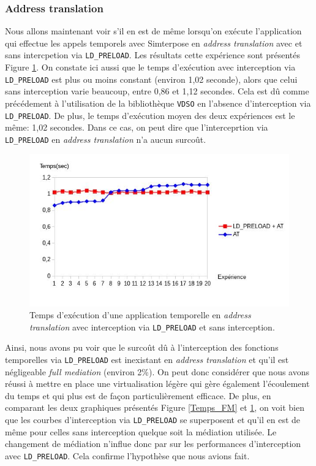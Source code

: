 \subsubsection{Address translation}
Nous allons maintenant voir s'il en est de même  lorsqu'on exécute l'application qui effectue les appels temporels avec Simterpose en \textit{address translation} avec et sans intercpetion via \texttt{LD\_PRELOAD}. Les résultats cette expérience sont présentés Figure \ref{Temps_AT}. On constate ici aussi que le temps d'exécution avec interception via \texttt{LD\_PRELOAD} est plus ou moins constant (environ 1,02 seconde), alors que celui sans interception varie beaucoup, entre 0,86 et 1,12 secondes. Cela est dû comme précédement à l'utilisation de la bibliothèque \texttt{VDSO} en l'absence d'interception via \texttt{LD\_PRELOAD}. De plus, le temps d'exécution moyen des deux expériences est le même: 1,02 secondes. Dans ce cas, on peut dire que l'interceprtion via \texttt{LD\_PRELOAD} en \textit{address translation} n'a aucun surcoût.

\begin{figure}[H]
  \centering
    \includegraphics[scale=0.65]{mesures/graph/Temps_AT.jpg}
    \caption[Temps d'exécution d'une application temporelle en \textit{address translation}]{Temps d'exécution d'une application temporelle en \textit{address translation} avec interception via \texttt{LD\_PRELOAD} et sans interception.}
    \label{Temps_AT}
\end{figure}


Ainsi, nous avons pu voir que le surcoût dû à l'interception des fonctions temporelles via \texttt{LD\_PRELOAD} est inexistant en \textit{address translation} et qu'il est négligeable \textit{full mediation} (environ 2\%). On peut donc considérer que nous avons réussi à mettre en place une virtualisation légère qui gère également l'écoulement du temps et qui plus est de façon particulièrement efficace. De plus, en comparant les deux graphiques présentés Figure \ref{Temps_FM} et \ref{Temps_AT}, on voit bien que les courbes d'interception via \texttt{LD\_PRELOAD} se superposent et qu'il en est de même pour celles sans interception quelque soit la médiation utilisée. Le changement de médiation n'influe donc par sur les performances d'interception avec \texttt{LD\_PRELOAD}. Cela confirme l'hypothèse que nous avions fait.

\vspace{0.5cm}
